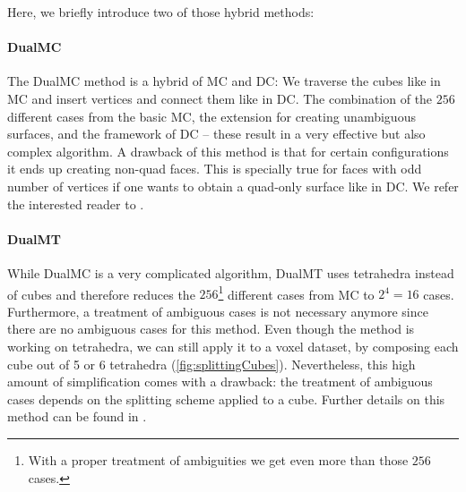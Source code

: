 Here, we briefly introduce two of those hybrid methods:

\paragraph*{\acl{DualMC}}
The \acf{DualMC} method is a hybrid of \ac{MC} and \ac{DC}: We traverse the cubes like in \ac{MC} and insert vertices and connect them like in \ac{DC}. The combination of the $256$ different cases from the basic \ac{MC}, the extension for creating unambiguous surfaces, and the framework of \ac{DC} -- these result in a very effective but also complex algorithm. A drawback of this method is that for certain configurations it ends up creating non-\ac{quad} faces. This is specially true for faces with odd number of vertices if one wants to obtain a \ac{quad}-only surface like in \ac{DC}. We refer the interested reader to  \cite{Nielson2004, Zhang2012}.

\paragraph*{\acl{DualMT}}
While \ac{DualMC} is a very complicated algorithm, \acf{DualMT} uses tetrahedra instead of cubes and therefore reduces the $256$\footnote{With a proper treatment of ambiguities we get even more than those $256$ cases.} different cases from \ac{MC} to $2^4=16$ cases. Furthermore, a treatment of ambiguous cases is not necessary anymore since there are no ambiguous cases for this method.
Even though the method is working on tetrahedra, we can still apply it to a voxel dataset, by composing each cube out of 5 or 6 tetrahedra (\autoref{fig:splittingCubes}). Nevertheless, this high amount of simplification comes with a drawback: the treatment of ambiguous cases depends on the splitting scheme applied to a cube. Further details on this method can be found in \cite{Nielson2008}.

